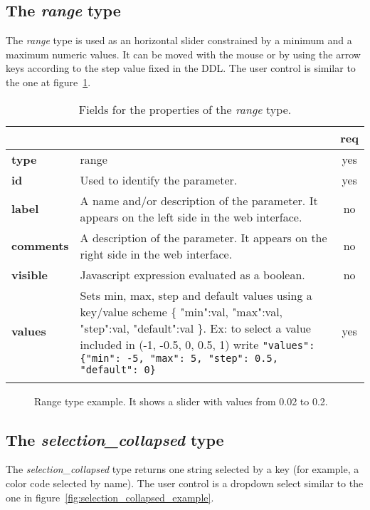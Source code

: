 \subsection{The \emph{range} type}

The \emph{range} type is used as an horizontal slider constrained by a minimum and a maximum numeric values. It can be moved with the mouse or by using the arrow keys according to the step value fixed in the DDL. The user control is similar to the one at figure~\ref{fig:sliders}.

\begin{longtable}{|>{\bf}L{\linewidth}|L{\linewidth}|c|}
\hline
      &  & {\bf req} 
\tabularnewline \hline \hline
 type   & range       & yes \\ \hline
 id     & Used to identify the parameter. & yes \\ \hline
 label  & A name and/or description of the parameter. It appears on the left side in the web interface. & no
                      \\ \hline
 comments & A description of the parameter. It appears on the right side in the web interface. & no
                      \\ \hline
 visible    & Javascript expression evaluated as a boolean. & no \\ \hline
 values & Sets min, max, step and default values using a key/value 
scheme \{ "min":val, "max":val, "step":val, "default":val \}. 
Ex: to select a value included in (-1, -0.5, 0, 0.5, 1) write \texttt{"values": \{"min": -5, "max": 5, "step": 0.5, "default": 0\}}  & yes
                      \\ \hline
\caption{Fields for the properties of the \emph{range} type.}
\end{longtable}

\begin{figure}[h]
\centering
{}
\caption{Range type example. It shows a slider with values from 0.02 to 0.2.}
\label{fig:sliders}
\end{figure}

\subsection{The \emph{selection\_collapsed} type}

The \emph{selection\_collapsed} type returns one string selected by a key (for example, a color code selected by name). The user control is a dropdown select similar to the one in figure~\ref{fig:selection_collapsed_example}.

